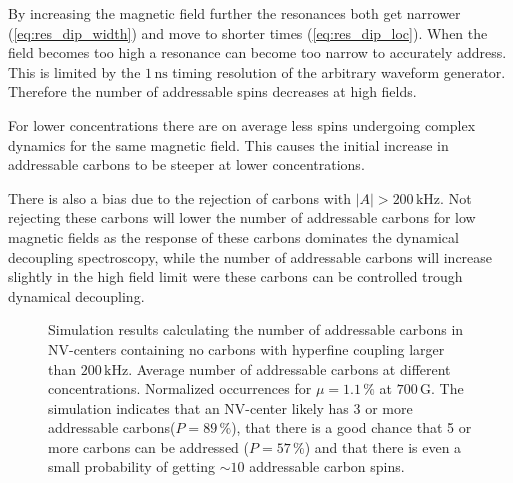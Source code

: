 By increasing the magnetic field further the resonances both get narrower (\cref{eq:res_dip_width}) and move to shorter times (\cref{eq:res_dip_loc}).
When the field becomes too high a resonance can become too narrow to accurately address.
This is limited by the $1\, \mathrm{ns}$ timing resolution of the arbitrary waveform generator.
Therefore the number of addressable spins decreases at high fields.

For lower concentrations there are on average less spins undergoing complex dynamics for the same magnetic field.
This causes the initial increase in addressable carbons to be steeper at lower concentrations.

There is also a bias due to the rejection of carbons with $|A|>200\,\mathrm{kHz}$.
Not rejecting these carbons will lower the number of addressable carbons for low magnetic fields as the response of these carbons dominates the dynamical decoupling spectroscopy, while the number of addressable carbons will increase slightly in the high field limit were these carbons can be controlled trough dynamical decoupling.

\begin{figure}[htbp]
    \begin{subfigure}[t]{0.49\textwidth}\centering
        \caption{}
        \label{fig:Simulations_avg_n_vs_bfield}
    \end{subfigure}
    \begin{subfigure}[t]{0.49\textwidth}\centering
    \caption{}
    \label{fig:simulations_histogram_vs_Bfield}
    \end{subfigure}
    \caption{Simulation results calculating the number of addressable carbons in NV-centers containing no carbons with hyperfine coupling larger than $200\, \mathrm{kHz}$.  Average number of addressable carbons at different concentrations.  Normalized occurrences for $\mu = 1.1\,\%$ at $700\,\mathrm{G}$. The simulation indicates that an NV-center likely has 3 or more addressable carbons($P=89\,\%$), that there is a good chance that 5 or more carbons can be addressed ($P=57\,\%$) and that there is even a small probability of getting $\sim 10$ addressable carbon spins. }
    \label{fig:Simulation_results}
\end{figure}



